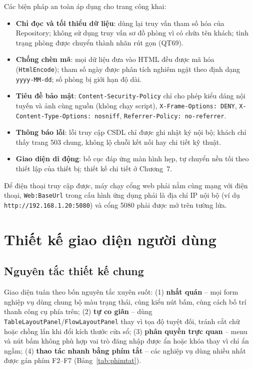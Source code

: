 \documentclass[14pt]{report}
\begin{document}
Các biện pháp an toàn áp dụng cho trang công khai:
\begin{itemize}
  \item \textbf{Chỉ đọc và tối thiểu dữ liệu}: dùng lại truy vấn tham số hóa của Repository; không sử dụng truy vấn sơ đồ phòng vì có chứa tên khách; tình trạng phòng được chuyển thành nhãn rút gọn (QT69).
  \item \textbf{Chống chèn mã}: mọi dữ liệu đưa vào HTML đều được mã hóa (\texttt{HtmlEncode}); tham số ngày được phân tích nghiêm ngặt theo định dạng \texttt{yyyy-MM-dd}; số phòng bị giới hạn độ dài.
  \item \textbf{Tiêu đề bảo mật}: \texttt{Content-Security-Policy} chỉ cho phép kiểu dáng nội tuyến và ảnh cùng nguồn (không chạy script), \texttt{X-Frame-Options: DENY}, \texttt{X-Content-Type-Options: nosniff}, \texttt{Referrer-Policy: no-referrer}.
  \item \textbf{Thông báo lỗi}: lỗi truy cập CSDL chỉ được ghi nhật ký nội bộ; khách chỉ thấy trang 503 chung, không lộ chuỗi kết nối hay chi tiết kỹ thuật.
  \item \textbf{Giao diện di động}: bố cục đáp ứng màn hình hẹp, tự chuyển nền tối theo thiết lập của thiết bị; thiết kế chi tiết ở Chương~7.
\end{itemize}

Để điện thoại truy cập được, máy chạy cổng web phải nằm cùng mạng với điện thoại, \texttt{Web:BaseUrl} trong cấu hình ứng dụng phải là địa chỉ IP nội bộ (ví dụ \texttt{http://192.168.1.20:5080}) và cổng 5080 phải được mở trên tường lửa.


\chapter{Thiết kế giao diện người dùng}

\section{Nguyên tắc thiết kế chung}

Giao diện tuân theo bốn nguyên tắc xuyên suốt: (1) \textbf{nhất quán} -- mọi form nghiệp vụ dùng chung bộ màu trạng thái, cùng kiểu nút bấm, cùng cách bố trí thanh công cụ phía trên; (2) \textbf{tự co giãn} -- dùng \texttt{TableLayoutPanel}/\texttt{FlowLayoutPanel} thay vì tọa độ tuyệt đối, tránh cắt chữ hoặc chồng lấn khi đổi kích thước cửa sổ; (3) \textbf{phân quyền trực quan} -- menu và nút bấm không phù hợp vai trò đăng nhập được ẩn hoặc khóa thay vì chỉ ẩn ngầm; (4) \textbf{thao tác nhanh bằng phím tắt} -- các nghiệp vụ dùng nhiều nhất được gán phím F2--F7 (Bảng~\ref{tab:phimtat}).
\end{document}
